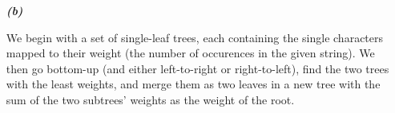 \documentclass{article}
\begin{document}
\begin{enumerate}
\begin{enumerate}
\begin{enumerate}
				\end{enumerate}

			\item[\textbf{\emph{(b)}}]

				We begin with a set of single-leaf trees, each containing the single
				characters mapped to their weight (the number of occurences in the
				given string). We then go bottom-up (and either left-to-right or
				right-to-left), find the two trees with the least weights, and merge
				them as two leaves in a new tree with the sum of the two subtrees'
				weights as the weight of the root.



		\end{enumerate}

\end{enumerate}
\end{document}
